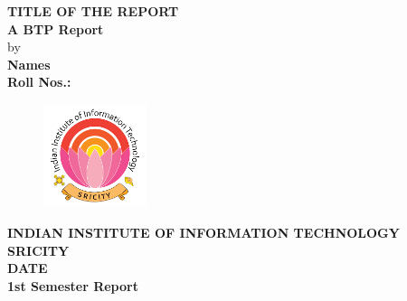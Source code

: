 \documentclass[a4paper,twoside,12pt]{report}
\begin{document}
\begin{titlepage}
\begin{center}

\Large \textbf{TITLE OF THE REPORT}\\
\vspace{2cm}
 \textbf{{A BTP Report}}\\
  \vspace{2cm}
by\\
\textbf{Names}\\
\textbf{\small Roll Nos.:}\\
\vspace{3cm}
\begin{figure}[htbp]
	\centering
		\includegraphics[width=0.27\textwidth]{IIITS.png}
	\label{fig:IITI}
\end{figure}
\Large \textbf{INDIAN INSTITUTE OF INFORMATION TECHNOLOGY SRICITY}\\
 \small \textbf{DATE}\\
  \small \textbf{1st Semester Report}\\
\end{center}
\end{titlepage}
\newpage
\mbox{}
\thispagestyle{empty}
%
\end{document}
